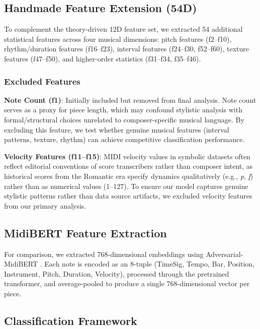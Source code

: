 \documentclass{article}
\begin{document}
\subsection{Handmade Feature Extension (54D)}

To complement the theory-driven 12D feature set, we extracted 54 additional statistical features across four musical dimensions: pitch features (f2--f10), rhythm/duration features (f16--f23), interval features (f24--f30, f52--f60), texture features (f47--f50), and higher-order statistics (f31--f34, f35--f46).

\subsubsection{Excluded Features}

\textbf{Note Count (f1)}: Initially included but removed from final analysis. Note count serves as a proxy for piece length, which may confound stylistic analysis with formal/structural choices unrelated to composer-specific musical language. By excluding this feature, we test whether genuine musical features (interval patterns, texture, rhythm) can achieve competitive classification performance.

\textbf{Velocity Features (f11--f15)}: MIDI velocity values in symbolic datasets often reflect editorial conventions of score transcribers rather than composer intent, as historical scores from the Romantic era specify dynamics qualitatively (e.g., \textit{p}, \textit{f}) rather than as numerical values (1--127). To ensure our model captures genuine stylistic patterns rather than data source artifacts, we excluded velocity features from our primary analysis.

\subsection{MidiBERT Feature Extraction}

For comparison, we extracted 768-dimensional embeddings using Adversarial-MidiBERT \cite{Zhao2025}. Each note is encoded as an 8-tuple (TimeSig, Tempo, Bar, Position, Instrument, Pitch, Duration, Velocity), processed through the pretrained transformer, and average-pooled to produce a single 768-dimensional vector per piece.

\subsection{Classification Framework}
\end{document}
